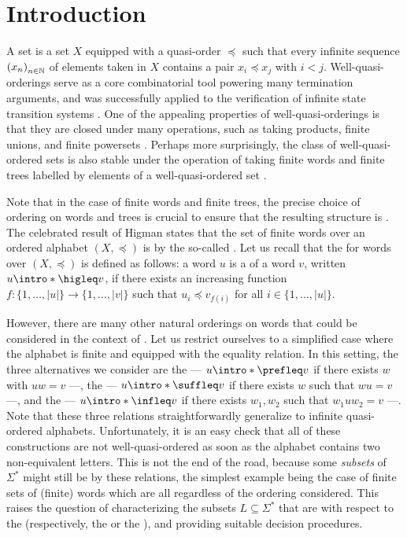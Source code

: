 \section{Introduction}
\label{introduction:sec}

A  set is a set $X$ equipped with a quasi-order
$\preceq$ such that every infinite sequence $\seqof{x_n}$ of elements taken in
$X$ contains a pair $x_i \preceq x_j$ with $i < j$. Well-quasi-orderings serve
as a core combinatorial tool powering many termination arguments, and was
successfully applied to the verification of infinite state transition systems
\cite{ABDU96,ABDU98}. One of the appealing properties of well-quasi-orderings
is that they are closed under many operations, such as taking products, finite
unions, and finite powersets \cite{SCSC12}. Perhaps more surprisingly, the
class of well-quasi-ordered sets is also stable under the operation of taking
finite words and finite trees labelled by elements of a well-quasi-ordered set
\cite{HIG52,KRU72}.

\AP
Note that in the case of finite words and finite trees, the precise choice of
ordering on words and trees is crucial to ensure that the resulting structure
is . The celebrated result of Higman states that the set
of finite words over an ordered alphabet $(X, \preceq)$ is
 by the so-called 
\cite{HIG52}. Let us recall that the  for words over $(X,
\preceq)$ is defined as follows: a word $u$ is a  of a word $v$,
written $u \intro*\higleq v$,
if there exists an increasing function $f \colon \{1, \ldots, |u|\} \to \{1,
\ldots, |v|\}$ such that $u_i \preceq v_{f(i)}$ for all $i \in \{1, \ldots,
|u|\}$.

\AP However, there are many other natural orderings on words that could be
considered in the context of . Let us restrict
ourselves to a simplified case where the alphabet is finite and equipped with
the equality relation. In this setting, the three alternatives we consider are
the  --- $u \intro*\prefleq v$ if there exists $w$ with
$uw = v$ ---, the  --- $u \intro*\suffleq v$ if there
exists $w$ such that $wu = v$ ---, and the  --- $u
\intro*\infleq v$ if there exists $w_1,w_2$ such that $w_1 u w_2 = v$ ---. Note
that these three relations straightforwardly generalize to infinite
quasi-ordered alphabets. Unfortunately, it is an easy check that all of these
constructions are not well-quasi-ordered as soon as the alphabet contains two
non-equivalent letters. This is not the end of the road, because some
\emph{subsets} of $\Sigma^*$ might still be  by these
relations, the simplest example being the case of finite sets of (finite) words
which are all  regardless of the ordering considered.
This raises the question of characterizing the subsets $L \subseteq \Sigma^*$
that are  with respect to the 
(respectively, the  or the ), and
providing suitable decision procedures.


